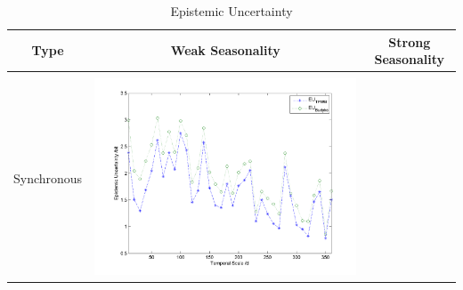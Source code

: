 \documentclass[11pt]{article}
\begin{document}
\begin{table}[H]\small
\caption{Epistemic Uncertainty}
\resizebox{\textwidth}{!}
{
\centering
\begin{tabular}{ccc}
\toprule
Type& Weak Seasonality & Strong Seasonality \\\hline
\\
Synchronous
&\begin{minipage}{.6\textwidth}\includegraphics[width=\linewidth]{resultgraph/05585000EU.png}\end{minipage}


\end{tabular}}
\end{table}
\end{document}
